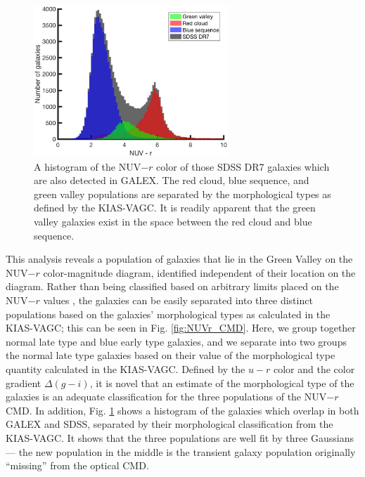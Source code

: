 \begin{figure}
    \includegraphics[width=0.65\textwidth]{Images/GV/NUVr_CMDclassifications}
    \caption[Distribution of NUV-$r$ of SDSS galaxies]{A histogram of the 
    NUV$-r$ color of those SDSS DR7 galaxies which are also detected in GALEX.  
    The red cloud, blue sequence, and green valley populations are separated by 
    the morphological types as defined by the KIAS-VAGC.  It is readily apparent 
    that the green valley galaxies exist in the space between the red cloud and 
    blue sequence.}
    \label{fig:NUVr_hist}
\end{figure}

This analysis reveals a population of galaxies that lie in the Green Valley on 
the NUV$-r$ color-magnitude diagram, identified independent of their location on 
the diagram.  Rather than being classified based on arbitrary limits placed on 
the NUV$-r$ values \citep[as done by][]{Schawinski14,Salim14a}, the galaxies can 
be easily separated into three distinct populations based on the galaxies' 
morphological types as calculated in the KIAS-VAGC; this can be seen in Fig. 
\ref{fig:NUVr_CMD}.  Here, we group together normal late type and blue early 
type galaxies, and we separate into two groups the normal late type galaxies 
based on their value of the morphological type quantity calculated in the 
KIAS-VAGC.  Defined by the $u-r$ color and the color gradient $\Delta (g-i)$, it 
is novel that an estimate of the morphological type of the galaxies is an 
adequate classification for the three populations of the NUV$-r$ CMD.  In 
addition, Fig. \ref{fig:NUVr_hist} shows a histogram of the galaxies which 
overlap in both GALEX and SDSS, separated by their morphological classification 
from the KIAS-VAGC.  It shows that the three populations are well fit by three 
Gaussians --- the new population in the middle is the transient galaxy 
population originally ``missing'' from the optical CMD.

